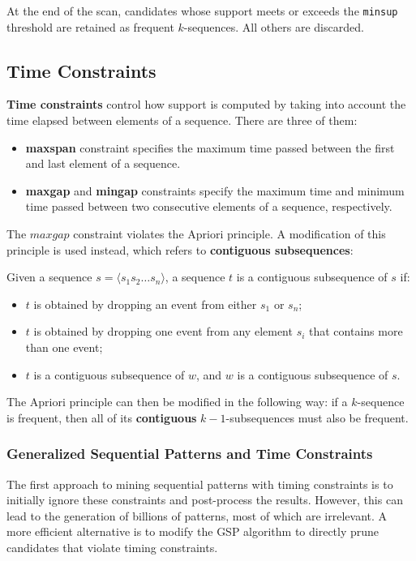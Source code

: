 At the end of the scan, candidates whose support meets or exceeds the \texttt{minsup} threshold are retained as frequent $k$-sequences. All others are discarded.


\subsection{Time Constraints}
\label{sec:tconstr}

\textbf{Time constraints} control how support is computed by taking into account the time elapsed between elements of a sequence. There are three of them:
\begin{itemize}
    \item \textbf{maxspan} constraint specifies the maximum time passed between the first and last element of a sequence.
    \item \textbf{maxgap} and \textbf{mingap} constraints specify the maximum time and minimum time passed between two consecutive elements of a sequence, respectively.
\end{itemize}
The $maxgap$ constraint violates the Apriori principle. A modification of this principle is used instead, which refers to \textbf{contiguous subsequences}: 

\begin{definition}
Given a sequence $s = \langle s_1s_2 \ldots s_n \rangle$, a sequence $t$ is a contiguous subsequence of $s$ if:

	\begin{itemize}
		\item[-] $t$ is obtained by dropping an event from either $s_1$ or $s_n$;
		\item[-] $t$ is obtained by dropping one event from any element $s_i$ that contains more than one event;
		\item[-] $t$ is a contiguous subsequence of $w$, and $w$ is a contiguous subsequence of $s$.
	\end{itemize}
\end{definition}
The Apriori principle can then be modified in the following way: if a $k$-sequence is frequent, then all of its \textbf{contiguous} $k-1$-subsequences must also be frequent.

\subsubsection{Generalized Sequential Patterns and Time Constraints}
The first approach to mining sequential patterns with timing constraints is to initially ignore these constraints and post-process the results. However, this can lead to the generation of billions of patterns, most of which are irrelevant. A more efficient alternative is to modify the GSP algorithm to directly prune candidates that violate timing constraints.

